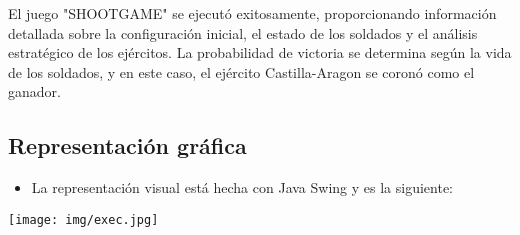 El juego "SHOOTGAME" se ejecutó exitosamente, proporcionando información detallada sobre la configuración inicial, el estado de los soldados y el análisis estratégico de los ejércitos. La probabilidad de victoria se determina según la vida de los soldados, y en este caso, el ejército Castilla-Aragon se coronó como el ganador.


\subsection{Representación gráfica}
\begin{itemize}
  \item La representación visual está hecha con Java Swing y es la siguiente: 
\end{itemize}

\texttt{[image: img/exec.jpg]}
